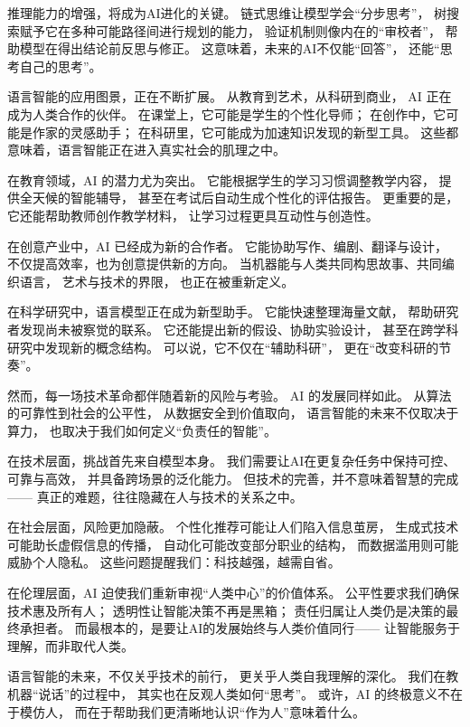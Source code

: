 推理能力的增强，将成为AI进化的关键。  
链式思维让模型学会“分步思考”，  
树搜索赋予它在多种可能路径间进行规划的能力，  
验证机制则像内在的“审校者”，  
帮助模型在得出结论前反思与修正。  
这意味着，未来的AI不仅能“回答”，  
还能“思考自己的思考”。  

语言智能的应用图景，正在不断扩展。  
从教育到艺术，从科研到商业，  
AI 正在成为人类合作的伙伴。  
在课堂上，它可能是学生的个性化导师；  
在创作中，它可能是作家的灵感助手；  
在科研里，它可能成为加速知识发现的新型工具。  
这些都意味着，语言智能正在进入真实社会的肌理之中。  

在教育领域，AI 的潜力尤为突出。  
它能根据学生的学习习惯调整教学内容，  
提供全天候的智能辅导，  
甚至在考试后自动生成个性化的评估报告。  
更重要的是，它还能帮助教师创作教学材料，  
让学习过程更具互动性与创造性。  

在创意产业中，AI 已经成为新的合作者。  
它能协助写作、编剧、翻译与设计，  
不仅提高效率，也为创意提供新的方向。  
当机器能与人类共同构思故事、共同编织语言，  
艺术与技术的界限，  
也正在被重新定义。  

在科学研究中，语言模型正在成为新型助手。  
它能快速整理海量文献，  
帮助研究者发现尚未被察觉的联系。  
它还能提出新的假设、协助实验设计，  
甚至在跨学科研究中发现新的概念结构。  
可以说，它不仅在“辅助科研”，  
更在“改变科研的节奏”。  

然而，每一场技术革命都伴随着新的风险与考验。  
AI 的发展同样如此。  
从算法的可靠性到社会的公平性，  
从数据安全到价值取向，  
语言智能的未来不仅取决于算力，  
也取决于我们如何定义“负责任的智能”。  

在技术层面，挑战首先来自模型本身。  
我们需要让AI在更复杂任务中保持可控、可靠与高效，  
并具备跨场景的泛化能力。  
但技术的完善，并不意味着智慧的完成——  
真正的难题，往往隐藏在人与技术的关系之中。  

在社会层面，风险更加隐蔽。  
个性化推荐可能让人们陷入信息茧房，  
生成式技术可能助长虚假信息的传播，  
自动化可能改变部分职业的结构，  
而数据滥用则可能威胁个人隐私。  
这些问题提醒我们：科技越强，越需自省。  

在伦理层面，AI 迫使我们重新审视“人类中心”的价值体系。  
公平性要求我们确保技术惠及所有人；  
透明性让智能决策不再是黑箱；  
责任归属让人类仍是决策的最终承担者。  
而最根本的，是要让AI的发展始终与人类价值同行——  
让智能服务于理解，而非取代人类。  

语言智能的未来，不仅关乎技术的前行，  
更关乎人类自我理解的深化。  
我们在教机器“说话”的过程中，  
其实也在反观人类如何“思考”。  
或许，AI 的终极意义不在于模仿人，  
而在于帮助我们更清晰地认识“作为人”意味着什么。  

